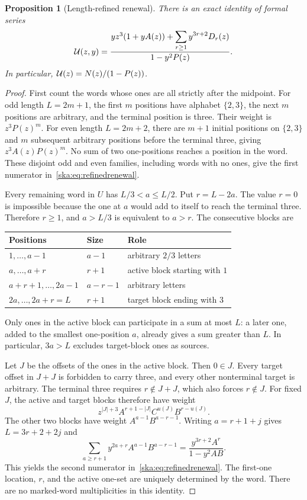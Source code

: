 \documentclass[11pt,letterpaper]{article}
\newtheorem{proposition}[theorem]{Proposition}
\theoremstyle{definition}
\begin{document}
\begin{proposition}[Length-refined renewal]\label{ska:prop:renewal}
There is an exact identity of formal series
\begin{equation}\label{ska:eq:refinedrenewal}
\mathcal U(z,y)=
\frac{yz^3(1+yA(z))+\displaystyle\sum_{r\ge1}y^{3r+2}D_r(z)}
{1-y^2P(z)}.
\end{equation}
In particular, $\mathcal U(z)=N(z)/(1-P(z))$.
\end{proposition}
\begin{proof}
First count the words whose ones are all strictly after the midpoint. For odd length $L=2m+1$, the first $m$ positions have alphabet $\{2,3\}$, the next $m$ positions are arbitrary, and the terminal position is three. Their weight is $z^3P(z)^m$. For even length $L=2m+2$, there are $m+1$ initial positions on $\{2,3\}$ and $m$ subsequent arbitrary positions before the terminal three, giving $z^3A(z)P(z)^m$. No sum of two one-positions reaches a position in the word. These disjoint odd and even families, including words with no ones, give the first numerator in~\eqref{ska:eq:refinedrenewal}.

Every remaining word in $U$ has $L/3<a\le L/2$. Put $r=L-2a$. The value $r=0$ is impossible because the one at $a$ would add to itself to reach the terminal three. Therefore $r\ge1$, and $a>L/3$ is equivalent to $a>r$. The consecutive blocks are
\begin{center}
\begin{tabular}{@{}lll@{}}
\toprule
Positions & Size & Role\\
\midrule
$1,\ldots,a-1$ & $a-1$ & arbitrary $2/3$ letters\\
$a,\ldots,a+r$ & $r+1$ & active block starting with $1$\\
$a+r+1,\ldots,2a-1$ & $a-r-1$ & arbitrary letters\\
$2a,\ldots,2a+r=L$ & $r+1$ & target block ending with $3$\\
\bottomrule
\end{tabular}
\end{center}
Only ones in the active block can participate in a sum at most $L$: a later one, added to the smallest one-position $a$, already gives a sum greater than $L$. In particular, $3a>L$ excludes target-block ones as sources.

Let $J$ be the offsets of the ones in the active block. Then $0\in J$. Every target offset in $J+J$ is forbidden to carry three, and every other nonterminal target is arbitrary. The terminal three requires $r\notin J+J$, which also forces $r\notin J$. For fixed $J$, the active and target blocks therefore have weight
\[
z^{|J|+3}A^{r+1-|J|}C^{u(J)}B^{r-u(J)}.
\]
The other two blocks have weight $A^{a-1}B^{a-r-1}$. Writing $a=r+1+j$ gives $L=3r+2+2j$ and
\[
\sum_{a\ge r+1}y^{2a+r}A^{a-1}B^{a-r-1}
=\frac{y^{3r+2}A^r}{1-y^2AB}.
\]
This yields the second numerator in~\eqref{ska:eq:refinedrenewal}. The first-one location, $r$, and the active one-set are uniquely determined by the word. There are no marked-word multiplicities in this identity.
\end{proof}
\end{document}
